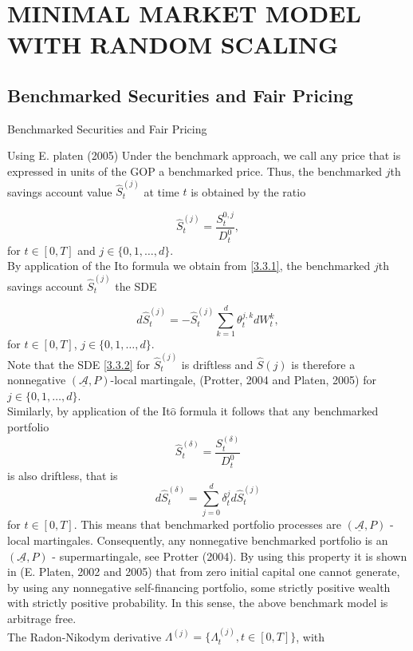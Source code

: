 \documentclass[unknownkeysallowed, compress]{beamer}
\theoremstyle{plain}
\begin{document}
\section{MINIMAL MARKET MODEL WITH RANDOM SCALING}

\subsection{Benchmarked Securities and Fair Pricing}
\begin{frame}[allowframebreaks]{Benchmarked Securities and Fair Pricing}
\noindent
\par Using E. platen (2005) Under the benchmark approach, we call any price that is expressed in units of the GOP a benchmarked price. Thus, the benchmarked $j$th
savings account value $\hat{S}^{(j)}_t$ at time $t$ is obtained by the ratio


\begin{equation}\label{3.3.1}
\hat{S}_t^{(j)} = \frac{S_t^{0,j}}{D_t^0},
\end{equation}
for $t\in [0,T]$ and $j\in\{0,1,\ldots,d\}.$\\
By application of the Ito formula we obtain from \eqref{3.3.1}, %
the benchmarked $j$th savings account $\hat{S}_t^{(j)}$  the SDE

\begin{equation}\label{3.3.2}
d\hat{S}_t^{(j)} = -\hat{S}_t^{(j)}\sum_{k = 1}^d\theta_t^{j,k}dW_t^k,
\end{equation}
for $t\in[0,T]$, $j\in\{0,1,\ldots,d\}$.\\
Note that the SDE \eqref{3.3.2} for $\hat{S}_t^{(j)}$  is driftless and $\hat{S}(j)$ is therefore a
nonnegative $(\mathcal{\underline{A}}, P)$-local martingale, (Protter, 2004 and Platen, 2005) for $j \in \{0,
1,\ldots, d\}.$\\
Similarly, by application of the It$\hat{\mbox{o}}$ formula it follows  %
 that any benchmarked portfolio
\begin{equation}\label{3.3.3}
\hat{S}_t^{(\delta)} = \frac{S_t^{(\delta)}}{D_t^0}
\end{equation}
is also driftless, that is
\begin{equation}\label{3.3.4}
d\hat{S}_t^{(\delta)} = \sum_{j = 0}^d\delta_t^jd\hat{S}_t^{(j)}
\end{equation}
for $t \in [0, T].$ This means that benchmarked portfolio processes are $(\mathcal{\underline{A}}, P)$ - local martingales. Consequently, any nonnegative benchmarked portfolio is an $(\mathcal{\underline{A}}, P)$ -
supermartingale, see Protter (2004). By using this property it is shown in (E. Platen, 2002 and 2005) that from zero initial capital one cannot generate, by
using any nonnegative self-financing portfolio, some strictly positive wealth with
strictly positive probability. In this sense, the above benchmark model is
arbitrage free.\\
The Radon-Nikodym derivative $\Lambda^{(j)} = \{\Lambda_t^{(j)},t\in[0,T]\}$, with


\end{frame}
\end{document}
